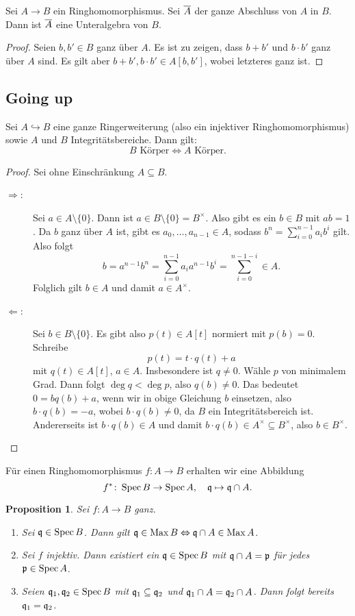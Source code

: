 \documentclass[12pt,a4paper]{scrartcl}
\theoremstyle{cplain}
\newtheorem{prop}[thmcounter]{Proposition}
\theoremstyle{cdef}
\begin{document}
\begin{kor}
	Sei $A\to B$ ein Ringhomomorphismus. Sei $\overline{A}$ der ganze Abschluss von $A$ in $B$. Dann ist $\overline{A}$ eine Unteralgebra von $B$.
\end{kor}
\begin{proof}
	Seien $b, b'\in B$ ganz über $A$. Es ist zu zeigen, dass $b+b'$ und $b\cdot b'$ ganz über $A$ sind. Es gilt aber $b+b', b\cdot b'\in A[b, b']$, wobei letzteres ganz ist.
\end{proof}

\subsection{Going up}
\begin{lem} \label{lem:6.7}
	Sei $A\hookrightarrow B$ eine ganze Ringerweiterung (also ein injektiver Ringhomomorphismus) sowie $A$ und $B$ Integritätsbereiche. Dann gilt: 
	\[B \text{ Körper}\Longleftrightarrow A\text{ Körper}.\]
\end{lem}
\begin{proof} Sei ohne Einschränkung $A\subseteq B$.
\begin{description}
	\item[\glqq$\Rightarrow$\grqq:] Sei $a\in A\setminus \{0\}$. Dann ist $a\in B\setminus\{0\} = B^{\times}$. Also gibt es ein $b\in B$ mit $ab = 1$. Da $b$ ganz über $A$ ist, gibt es $a_0,\dots, a_{n-1}\in A$, sodass $b^n = \sum_{i = 0}^{n-1}a_ib^i$ gilt. Also folgt
	\[ b = a^{n-1}b^n = \sum_{i = 0}^{n-1} a_ia^{n-1}b^i = \sum_{i = 0}^{n-1-i}\in A. \]
	Folglich gilt $b\in A$ und damit $a\in A^{\times}$.
	\item[\glqq$\Leftarrow$\grqq:] Sei $b\in B\setminus\{0\}$. Es gibt also $p(t) \in A[t]$ normiert mit $p(b) = 0$. Schreibe
	$$p(t) = t\cdot q(t) + a$$
	mit $q(t)\in A[t]$, $a\in A$. Insbesondere ist $q\neq 0$. Wähle $p$ von minimalem Grad. Dann folgt $\deg q < \deg p$, also $q(b) \neq 0$. Das bedeutet $0 = bq(b)+a$, wenn wir in obige Gleichung $b$ einsetzen, also $b\cdot q(b)  = -a$, wobei $b\cdot q(b) \neq 0$, da $B$ ein Integritätsbereich ist. Andererseits ist $b\cdot q(b) \in A$ und damit $b\cdot q(b) \in A^{\times}\subseteq B^{\times}$, also $b\in B^{\times}$.
	\qedhere
\end{description}	
\end{proof}
Für einen Ringhomomorphismus $f\colon A \to B$ erhalten wir eine Abbildung \[f^*\colon \operatorname{Spec} B\to \operatorname{Spec} A, \quad \mathfrak{q}\mapsto \mathfrak{q}\cap A.\]
\begin{prop} \label{prop:6.8}
	Sei $f\colon A \to B$ ganz.
	\begin{enumerate}
		\item Sei $\mathfrak{q}\in \operatorname{Spec} B$. Dann gilt $\mathfrak{q}\in \operatorname{Max} B \Leftrightarrow \mathfrak{q}\cap A\in \operatorname{Max} A$. \label{prop:6.8:i}
		\item Sei $f$ injektiv. Dann existiert ein $\mathfrak{q} \in \operatorname{Spec} B$ mit $\mathfrak{q}\cap A = \mathfrak{p}$ für jedes $\mathfrak{p} \in \operatorname{Spec} A$. \label{prop:6.8:ii}
		\item Seien $\mathfrak{q}_1,\mathfrak{q}_2\in\operatorname{Spec} B$ mit $\mathfrak{q}_1\subseteq \mathfrak{q}_2$ und $\mathfrak{q}_1\cap A = \mathfrak{q}_2\cap A$. Dann folgt bereits $\mathfrak{q}_1 = \mathfrak{q}_2$. \label{prop:6.8:iii}
	\end{enumerate}
\end{prop}
\end{document}

